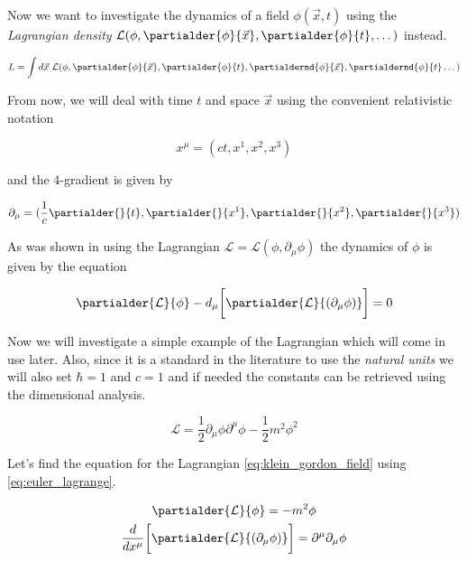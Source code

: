 Now we want to investigate the dynamics of a field $\phi(\vec{x}, t)$ using the \textit{Lagrangian density}
$\mathcal{L}(\phi, \partialder{\phi}{\vec{x}}, \partialder{\phi}{t}, \dots)$ instead.

\begin{equation}
    \label{eq:lagrangian_density}
    L = \int d\vec{x} \ \mathcal{L}(\phi, \partialder{\phi}{\vec{x}}, \partialder{\phi}{t}, \partialdernd{\phi}{\vec{x}}, \partialdernd{\phi}{t} \dots)
\end{equation}

From now, we will deal with time $t$ and space $\vec{x}$ using the convenient relativistic notation

\begin{equation*}
    x^{\mu} = (ct, x^{1}, x^{2}, x^{3})
\end{equation*}
    
and the 4-gradient is given by 

\begin{equation*}
    \partial_{\mu} = (\frac{1}{c} \partialder{}{t}, \partialder{}{x^{1}}, \partialder{}{x^{2}}, \partialder{}{x^{3}})
\end{equation*}

As was shown in \cite{goldstein} using the Lagrangian $\mathcal{L} = \mathcal{L}(\phi, \partial_{\mu} \phi)$ the dynamics of $\phi$ is given 
by the equation

\begin{equation}
    \label{eq:euler_lagrange}
    \partialder{\mathcal{L}}{\phi} - d_{\mu} \bigg[ \partialder{\mathcal{L}}{(\partial_{\mu} \phi)} \bigg] = 0
\end{equation}

Now we will investigate a simple example of the Lagrangian which will come in use later. Also, since it is a standard in
the literature to use the \textit{natural units} we will also set $\hbar = 1$ and $c = 1$ and if needed the constants
can be retrieved using the dimensional analysis.

\begin{equation}
    \label{eq:klein_gordon_field}
    \mathcal{L} = \frac{1}{2} \partial_{\mu} \phi \partial^{\mu} \phi - \frac{1}{2} m^{2} \phi^{2}
\end{equation}

Let's find the equation for the Lagrangian \ref{eq:klein_gordon_field} using \ref{eq:euler_lagrange}.

\begin{equation*}
    \begin{gathered}
        \partialder{\mathcal{L}}{\phi} = - m^2 \phi \\
        \frac{d}{dx^{\mu}} \bigg[ \partialder{\mathcal{L}}{(\partial_{\mu} \phi)} \bigg] = \partial^{\mu} \partial_{\mu} \phi
    \end{gathered}
\end{equation*}

